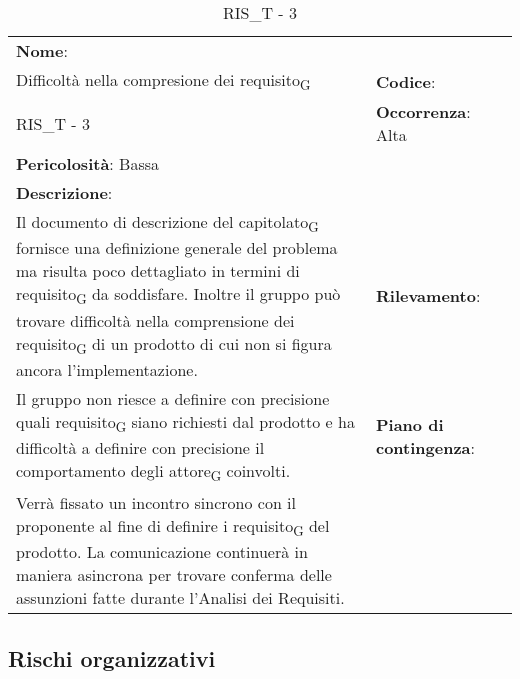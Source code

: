 \renewcommand{\arraystretch}{1.5}
\begin{longtable} { 
		>{\raggedright}p{} 
		>{\raggedright}p{} 
		>{\raggedright}p{}    }
	
	\caption{RIS\_T - 3} \endhead	
	
	
	\textbf{Nome}: \\ Difficoltà nella compresione dei requisito\textsubscript{G}
	& \textbf{Codice}: \\ RIS\_T - 3  
	& \textbf{Occorrenza}: Alta \\ \textbf{Pericolosità}: Bassa
	
	\tabularnewline
	
	\textbf{Descrizione}: \\ Il documento di descrizione del capitolato\textsubscript{G} fornisce una definizione generale del problema ma risulta poco dettagliato in termini di requisito\textsubscript{G} da soddisfare. Inoltre il gruppo può trovare difficoltà nella comprensione dei requisito\textsubscript{G} di un prodotto di cui non si figura ancora l'implementazione.
	& 
	\textbf{Rilevamento}: \\ Il gruppo non riesce a definire con precisione quali requisito\textsubscript{G} siano richiesti dal prodotto e ha difficoltà a definire con precisione il comportamento degli attore\textsubscript{G} coinvolti.
	
	&  
	\textbf{Piano di contingenza}: \\ Verrà fissato un incontro sincrono con il proponente al fine di definire i requisito\textsubscript{G} del prodotto. La comunicazione continuerà in maniera asincrona per trovare conferma delle assunzioni fatte durante l'Analisi dei Requisiti.
	
\end{longtable}

\newpage

\subsection{Rischi organizzativi}


